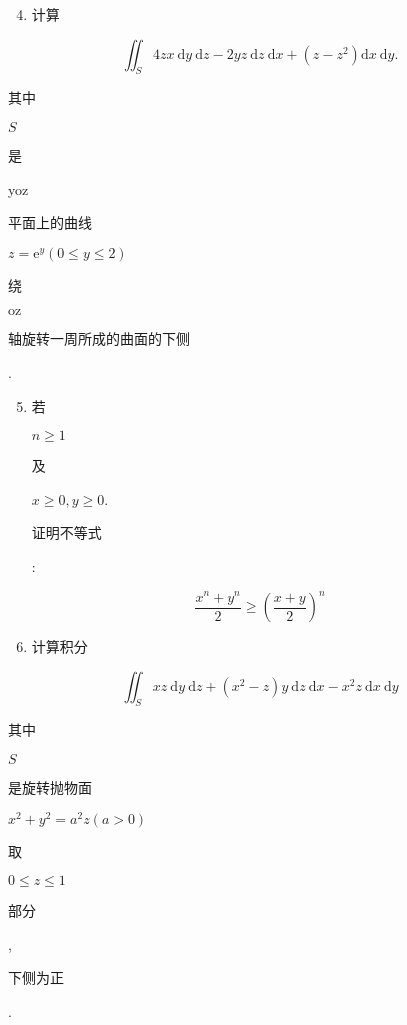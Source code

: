 \documentclass[10pt]{article}
\begin{document}
\begin{enumerate}
  \setcounter{enumi}{3}
  \item \begin{CJK}{UTF8}{mj}计算\end{CJK}
\end{enumerate}
$$
\iint_{S} 4 z x \mathrm{~d} y \mathrm{~d} z-2 y z \mathrm{~d} z \mathrm{~d} x+\left(z-z^{2}\right) \mathrm{d} x \mathrm{~d} y .
$$
\begin{CJK}{UTF8}{mj}其中\end{CJK} $S$ \begin{CJK}{UTF8}{mj}是\end{CJK} yoz \begin{CJK}{UTF8}{mj}平面上的曲线\end{CJK} $z=\mathrm{e}^{y}(0 \leq y \leq 2)$ \begin{CJK}{UTF8}{mj}绕\end{CJK} $\mathrm{oz}$ \begin{CJK}{UTF8}{mj}轴旋转一周所成的曲面的下侧\end{CJK}.

\begin{enumerate}
  \setcounter{enumi}{4}
  \item \begin{CJK}{UTF8}{mj}若\end{CJK} $n \geq 1$ \begin{CJK}{UTF8}{mj}及\end{CJK} $x \geq 0, y \geq 0$. \begin{CJK}{UTF8}{mj}证明不等式\end{CJK}:
\end{enumerate}
$$
\frac{x^{n}+y^{n}}{2} \geq\left(\frac{x+y}{2}\right)^{n}
$$

\begin{enumerate}
  \setcounter{enumi}{5}
  \item \begin{CJK}{UTF8}{mj}计算积分\end{CJK}
\end{enumerate}
$$
\iint_{S} x z \mathrm{~d} y \mathrm{~d} z+\left(x^{2}-z\right) y \mathrm{~d} z \mathrm{~d} x-x^{2} z \mathrm{~d} x \mathrm{~d} y
$$
\begin{CJK}{UTF8}{mj}其中\end{CJK} $S$ \begin{CJK}{UTF8}{mj}是旋转抛物面\end{CJK} $x^{2}+y^{2}=a^{2} z(a>0)$ \begin{CJK}{UTF8}{mj}取\end{CJK} $0 \leq z \leq 1$ \begin{CJK}{UTF8}{mj}部分\end{CJK}, \begin{CJK}{UTF8}{mj}下侧为正\end{CJK}.
\end{document}
